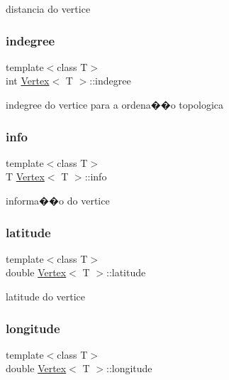 distancia do vertice \mbox{\label{class_vertex_ab29ac1b694fc673ba26cfc6d3e9bda13}} 
\subsubsection{\texorpdfstring{indegree}{indegree}}
{\footnotesize\ttfamily template$<$class T$>$ \\
int \mbox{\hyperlink{class_vertex}{Vertex}}$<$ T $>$\+::indegree\hspace{0.3cm}{\ttfamily [private]}}

indegree do vertice para a ordena��o topologica \mbox{\label{class_vertex_a415d7811eef6cdd992f0dca1f35a49cd}} 
\subsubsection{\texorpdfstring{info}{info}}
{\footnotesize\ttfamily template$<$class T$>$ \\
T \mbox{\hyperlink{class_vertex}{Vertex}}$<$ T $>$\+::info\hspace{0.3cm}{\ttfamily [private]}}

informa��o do vertice \mbox{\label{class_vertex_a960be3c1167e82abe7fcb81178674e5e}} 
\subsubsection{\texorpdfstring{latitude}{latitude}}
{\footnotesize\ttfamily template$<$class T$>$ \\
double \mbox{\hyperlink{class_vertex}{Vertex}}$<$ T $>$\+::latitude\hspace{0.3cm}{\ttfamily [private]}}

latitude do vertice \mbox{\label{class_vertex_a830e29c233af0899c087d9873864c477}} 
\subsubsection{\texorpdfstring{longitude}{longitude}}
{\footnotesize\ttfamily template$<$class T$>$ \\
double \mbox{\hyperlink{class_vertex}{Vertex}}$<$ T $>$\+::longitude\hspace{0.3cm}{\ttfamily [private]}}

